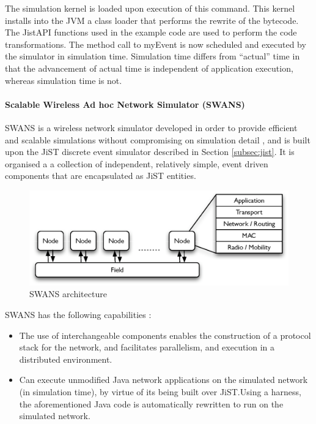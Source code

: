 The simulation kernel is loaded upon execution of this command. This kernel
installs into the JVM a class loader that performs the rewrite of the bytecode.
The JistAPI functions used in the example code are used to perform the
code transformations. The method call to myEvent is now scheduled and executed
by the simulator in simulation time. Simulation time differs from ``actual''
time in that the advancement of actual time is independent of application
execution, whereas simulation time is not. 
 
\paragraph{Scalable Wireless Ad hoc Network Simulator (SWANS)}
SWANS is a wireless network simulator developed in order to provide efficient
and scalable simulations without compromising on simulation detail \cite{barr_SWANS},
and is built upon the JiST discrete event simulator described in Section \ref{subsec:jist}. 
It is organised a a collection of independent, relatively simple, event driven
components that are encapsulated as JiST entities. 

\begin{figure}[h]
\centering
\includegraphics[width=\textwidth]{img/SWANS_architecture.eps} 
\caption[SWANS architecture]{SWANS architecture}
\label{Fig:SWANS_architecture}
\end{figure} 
  
SWANS has the following capabilities \cite{barr_SWANS}:

\begin{itemize}
\item The use of
interchangeable components enables the construction of a protocol stack for the
network, and facilitates parallelism, and execution in a distributed environment.
\item Can execute unmodified Java network applications on the
simulated network (in simulation time), by virtue of its being built over
JiST.Using a harness, the aforementioned Java code is automatically rewritten to
run on the simulated network.  
\end{itemize}
   
